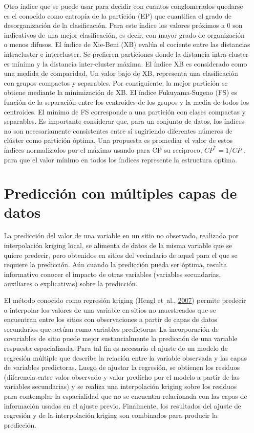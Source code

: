 \documentclass[11pt,b5paper,]{krantz}
\begin{document}
Otro índice que se puede usar para decidir con cuantos conglomerados quedarse es el conocido como entropía de la partición (EP) que cuantifica el grado de desorganización de la clasificación. Para este índice los valores próximos a 0 son indicativos de una mejor clasificación, es decir, con mayor grado de organización o menos difusos. El índice de Xie-Beni (XB) evalúa el cociente entre las distancias intracluster e intercluster. Se prefieren particiones donde la distancia intra-cluster es mínima y la distancia inter-cluster máxima. El índice XB es considerado como una medida de compacidad. Un valor bajo de XB, representa una clasificación con grupos compactos y separables. Por consiguiente, la mejor partición se obtiene mediante la minimización de XB. El índice Fukuyama-Sugeno (FS) es función de la separación entre los centroides de los grupos y la media de todos los centroides. El mínimo de FS corresponde a una partición con clases compactas y separables. Es importante considerar que, para un conjunto de datos, los índices no son necesariamente consistentes entre sí sugiriendo diferentes números de clúster como partición óptima. Una propuesta es promediar el valor de estos índices normalizados por el máximo usando para CP su reciproco, \(CP^*=1/CP\) , para que el valor mínimo en todos los índices represente la estructura optima.

\hypertarget{predicciuxf3n-con-muxfaltiples-capas-de-datos}{%
\chapter{Predicción con múltiples capas de datos}\label{predicciuxf3n-con-muxfaltiples-capas-de-datos}}

La predicción del valor de una variable en un sitio no observado, realizada por interpolación kriging local, se alimenta de datos de la misma variable que se quiere predecir, pero obtenidos en sitios del vecindario de aquel para el que se requiere la predicción. Aún cuando la predicción pueda ser óptima, resulta informativo conocer el impacto de otras variables (variables secundarias, auxiliares o explicativas) sobre la predicción.

El método conocido como regresión kriging (Hengl et~al., \protect\hyperlink{ref-Hengl_Heuvelink_Rossiter_2007}{2007}) permite predecir o interpolar los valores de una variable en sitios no muestreados que se encuentran entre los sitios con observaciones a partir de capas de datos secundarios que actúan como variables predictoras. La incorporación de covariables de sitio puede mejor sustancialmente la predicción de una variable respuesta espacializada. Para tal fin es necesario el ajuste de un modelo de regresión múltiple que describe la relación entre la variable observada y las capas de variables predictoras. Luego de ajustar la regresión, se obtienen los residuos (diferencia entre valor observado y valor predicho por el modelo a partir de las variables secundarias) y se realiza una interpolación kriging sobre los residuos para contemplar la espacialidad que no se encuentra relacionada con las capas de información usadas en el ajuste previo. Finalmente, los resultados del ajuste de regresión y de la interpolación kriging son combinados para producir la predicción.
\end{document}
